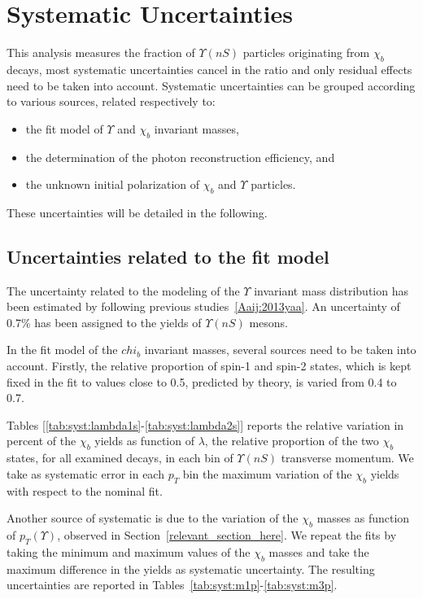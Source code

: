 \section{Systematic Uncertainties}
\label{sec:syst}

This analysis measures the fraction of $\Upsilon(nS)$ particles originating
from $\chi_b$ decays, most systematic uncertainties cancel in the ratio and
only residual effects need to be taken into account. Systematic uncertainties
can be grouped according to various sources, related respectively to:
\begin{itemize}
\item the fit model of $\Upsilon$ and $\chi_b$ invariant masses, 
\item the determination of the photon reconstruction efficiency, and 
\item the unknown initial polarization of $\chi_b$ and $\Upsilon$ particles. 
\end{itemize}
These uncertainties will be detailed in the following. 

\subsection{Uncertainties related to the fit model}

The uncertainty related to the modeling of the $\Upsilon$ invariant mass
distribution has been estimated by following previous
studies~\ref{Aaij:2013yaa}. An uncertainty of 0.7\% has been assigned to the
yields of $\Upsilon(nS)$ mesons.

In the fit model of the $chi_b$ invariant masses, several sources need to be
taken into account. Firstly, the relative proportion of spin-1 and spin-2
states, which is kept fixed in the fit to values close to 0.5, predicted by
theory, is varied from 0.4 to 0.7. 

Tables [\ref{tab:syst:lambda1s}-\ref{tab:syst:lambda2s}] reports the relative
variation in percent of the $\chi_b$ yields as function of $\lambda$, the
relative proportion of the two $\chi_b$ states, for all examined decays, in
each bin of $\Upsilon(nS)$ transverse momentum. We take as systematic error in
each $p_T$ bin the maximum variation of the $\chi_b$ yields with respect to the
nominal fit.

Another source of systematic is due to the variation of the $\chi_b$ masses as
function of $p_T(\Upsilon)$, observed in Section~\ref{relevant_section_here}.
We repeat the fits by taking the minimum and maximum values of the $\chi_b$
masses and take the maximum difference in the yields as systematic uncertainty.
The resulting uncertainties are reported in
Tables~\ref{tab:syst:m1p}-\ref{tab:syst:m3p}.


